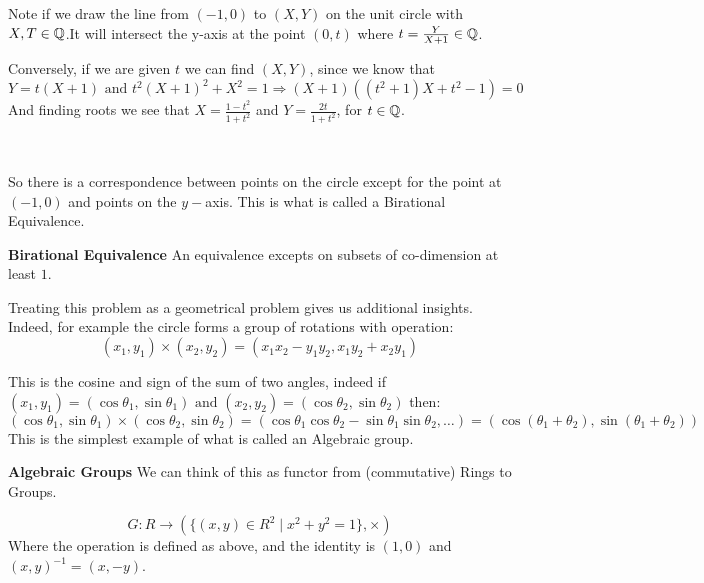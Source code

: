 \begin{enumerate}
    Note if we draw the line from $(-1,0)$ to $(X,Y)$ on the unit circle with $X,T\in \mathbb{Q}$.It will intersect the y-axis at the point $(0,t)$ where $t=\frac{Y}{X+1}\in \mathbb{Q}$.
    
    Conversely, if we are given $t$ we can find $(X,Y)$, since we know that\begin{equation*}
        Y=t(X+1) \text{ and }t^2{(X+1)}^2 + X^2 = 1 \Rightarrow (X+1)((t^2+1)X+t^2-1) = 0
    \end{equation*}
    And finding roots we see that $X = \frac{1-t^2}{1+t^2}$ and $Y=\frac{2t}{1+t^2}$, for $t\in \mathbb{Q}$.
    
    \
    
    So there is a correspondence between points on the circle except for the point at $(-1,0)$ and points on the $y-$axis. This is what is called a Birational Equivalence.
    
    \begin{definition}
        \textbf{Birational Equivalence}
        An equivalence excepts on subsets of co-dimension at least $1$.
    \end{definition}
\end{enumerate}
Treating this problem as a geometrical problem gives us additional insights. Indeed, for example the circle forms a group of rotations with operation:\begin{equation}
    (x_1,y_1)\times (x_2,y_2) = (x_1x_2-y_1y_2,x_1y_2+x_2y_1)
\end{equation}

This is the cosine and sign of the sum of two angles, indeed if $(x_1,y_1) = (\cos\theta_1,\sin\theta_1)\text{ and }(x_2,y_2) = (\cos\theta_2,\sin\theta_2)$ then:\begin{equation}
 (\cos\theta_1,\sin\theta_1)\times (\cos\theta_2,\sin\theta_2) = (\cos\theta_1\cos\theta_2-\sin\theta_1\sin\theta_2, \dots) = (\cos(\theta_1+\theta_2),\sin(\theta_1+\theta_2))
\end{equation}
This is the simplest example of what is called an Algebraic group.

\begin{definition}
    \textbf{Algebraic Groups} We can think of this as functor from (commutative) Rings to Groups.

    \begin{equation}
        G\colon R\rightarrow (\{(x,y)\in R^2\mid x^2+y^2=1\},\times)
     \end{equation}
     Where the operation is defined as above, and the identity is $(1,0)$ and ${(x,y)}^{-1} = (x,-y)$.
     
\end{definition}

